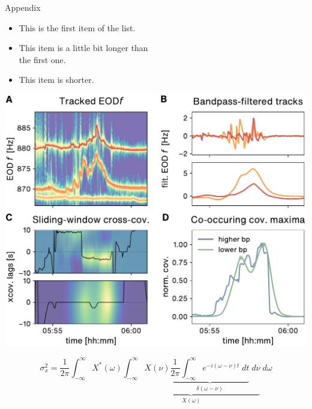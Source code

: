 \documentclass[10pt, aspectratio=169]{beamer}
\newenvironment{items}{
    \begin{itemize}
    \setlength{\itemsep}{10pt}
    \setlength{\parskip}{0pt}
    \setlength{\parsep}{0pt}}{
\end{itemize}
}
\begin{document}
\begin{frame}[fragile]{Appendix}
    \begin{minipage}[c]{0.5\textwidth}
    \begin{items}
        \item This is the first item of the list.
        \item This item is a little bit longer than\\the first one.
        \item This item is shorter.
    \end{items}
    \end{minipage}%
    \begin{minipage}[c]{0.5\textwidth}
        \vspace{0.5cm}
        \includegraphics[width=\textwidth]{
            assets/CovDetector_backend_ids_26788_26789_index_0.pdf}
    \end{minipage}%
\end{frame}

\begin{frame}[standout]
$$\sigma_x^2 =
\frac{1}{2\pi}\int_{-\infty}^{\infty}X^*(\omega)\underbrace{\int_{-\infty}^{\infty} X(\nu) \underbrace{\frac{1}{2\pi}\int_{-\infty}^{\infty} e^{-i(\omega-\nu)t}\; dt}_{\delta(\omega-\nu)} \; d\nu}_{X(\omega)} \; d \omega
$$
\end{frame}
\end{document}
